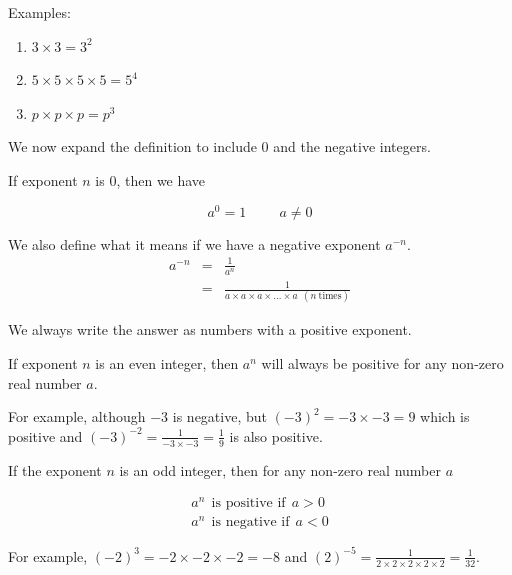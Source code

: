 Examples:
\begin{enumerate}[noitemsep, label=\textbf{\arabic*.}]
\item $3 \times 3 = 3^2$
\item $5 \times 5 \times 5 \times 5 = 5^4 $
\item $p \times p \times p = p^3$
\end{enumerate}

We now expand the definition to include 0 and the negative integers.

If exponent $n$ is 0, then we have 

$$ a^0 = 1 \hspace{1cm} a \ne 0 $$


We also define what it means if we have a negative exponent $a^{-n}$.
\begin{eqnarray*}
    a^{-n} &=& \frac{1}{a^n} \\
           &=& \frac{1}{a \times a \times a \times \ldots \times a ~~ (n ~ \textrm{times})} 
\end{eqnarray*}


      
We always write the answer as numbers with a positive exponent.


If exponent $n$ is an even integer, then ${a}^{n}$ will always be positive for any non-zero real number $a$. 

For example, although $-3$ is negative, but $(-3)^2=-3 \times -3 = 9$ which is positive and $(-3)^{-2} = \frac{1}{-3 \times -3} = \frac{1}{9} $ is also positive.

\par
If the exponent $n$ is an odd integer, then for any non-zero real number $a$ 

\begin{eqnarray*}
a^n ~~ \textrm{is positive if} ~~ a > 0 \\
a^n ~~ \textrm{is negative if} ~~ a < 0
\end{eqnarray*}

For example, $(-2)^3 = -2 \times -2 \times -2 = -8$ and $(2)^{-5} = \frac{1}{2 \times 2 \times 2 \times 2 \times 2} = \frac{1}{32}$.

